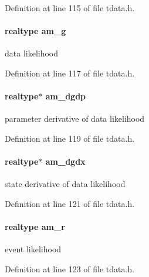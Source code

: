 Definition at line 115 of file tdata.\+h.

\hypertarget{struct_temp_data_abcec297db6f0e216e479c6f4f2cdb5ff}{}
\paragraph[{am\+\_\+g}]{\setlength{\rightskip}{0pt plus 5cm}realtype am\+\_\+g}\label{struct_temp_data_abcec297db6f0e216e479c6f4f2cdb5ff}
data likelihood 

Definition at line 117 of file tdata.\+h.

\hypertarget{struct_temp_data_a081b11391c89402abac604021f6ccf9d}{}
\paragraph[{am\+\_\+dgdp}]{\setlength{\rightskip}{0pt plus 5cm}realtype$\ast$ am\+\_\+dgdp}\label{struct_temp_data_a081b11391c89402abac604021f6ccf9d}
parameter derivative of data likelihood 

Definition at line 119 of file tdata.\+h.

\hypertarget{struct_temp_data_ae858332947a50294436a0bbf2b7a8ea1}{}
\paragraph[{am\+\_\+dgdx}]{\setlength{\rightskip}{0pt plus 5cm}realtype$\ast$ am\+\_\+dgdx}\label{struct_temp_data_ae858332947a50294436a0bbf2b7a8ea1}
state derivative of data likelihood 

Definition at line 121 of file tdata.\+h.

\hypertarget{struct_temp_data_a7f00edd52d15fce2def96917a9ee47dc}{}
\paragraph[{am\+\_\+r}]{\setlength{\rightskip}{0pt plus 5cm}realtype am\+\_\+r}\label{struct_temp_data_a7f00edd52d15fce2def96917a9ee47dc}
event likelihood 

Definition at line 123 of file tdata.\+h.

